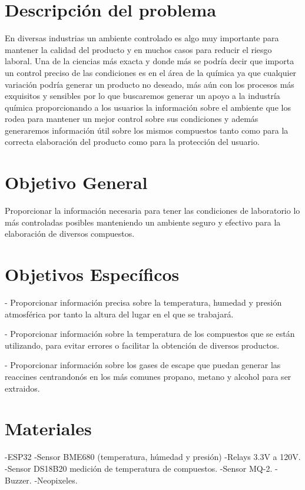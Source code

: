 \documentclass[10pt,twocolumn,letterpaper]{article}
\begin{document}
\begin{Abstract}
\section{Descripción del problema}
En diversas industrias un ambiente controlado es algo muy importante para mantener la calidad del producto y en muchos casos para reducir el riesgo laboral. Una de la ciencias más exacta y donde más se podría decir que importa un control preciso de las condiciones es en el área de la química ya que cualquier variación podría generar un producto no deseado, más aún con los procesos más exquisitos y sensibles por lo que buscaremos generar un apoyo a la industría química proporcionando a los usuarios la información sobre el ambiente que los rodea para mantener un mejor control sobre sus condiciones y además generaremos información útil sobre los mismos compuestos tanto como para la correcta elaboración del producto como para la protección del usuario. 

\section{Objetivo General}
Proporcionar la información necesaria para tener las condiciones de laboratorio lo más controladas posibles manteniendo un ambiente seguro y efectivo para la elaboración de diversos compuestos.

\section{Objetivos Específicos}
    - Proporcionar información precisa sobre la temperatura, humedad y presión atmosférica por tanto la altura del lugar en el que se trabajará. 

    - Proporcionar información sobre la temperatura de los compuestos que se están utilizando, para evitar errores o facilitar la obtención de diversos productos.

    - Proporcionar información sobre los gases de escape que puedan generar las reaccines centrandonós en los más comunes propano, metano y alcohol para ser extraidos.


\section{Materiales}
-ESP32
-Sensor BME680 (temperatura, húmedad y presión)
-Relays 3.3V a 120V.
-Sensor DS18B20 medición de temperatura de compuestos.
-Sensor MQ-2.
-Buzzer.
-Neopixeles.


\end{Abstract}
\end{document}
